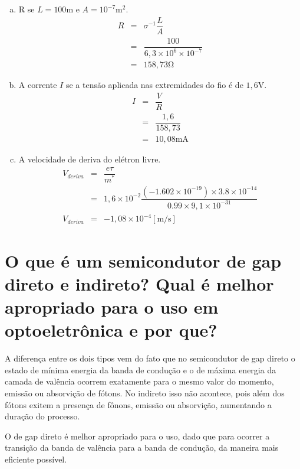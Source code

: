 \begin{enumerate}[a)]
  \item R se $L = 100 \si{\meter}$ e $A = 10^{-7} \si{\meter^{2}}$.
    \begin{eqnarray*}
      R & = & \sigma^{-1} \dfrac{L}{A} \\ \nonumber
        & = & \dfrac{100}{6,3 \times 10^{6} \times 10^{-7}} \\ \nonumber
        & = & 158,73 \si{\ohm}\nonumber
    \end{eqnarray*}
  \item A corrente $I$ se a tensão aplicada nas extremidades do fio é
    de $1,6 \si{\volt}$.
    \begin{eqnarray*}
      I & = & \dfrac{V}{R} \\ \nonumber
        & = & \dfrac{1,6}{158,73} \\ \nonumber
        & = & 10,08 \si{\milli\ampere}\nonumber
    \end{eqnarray*}
  \item A velocidade de deriva do elétron livre.
    \begin{eqnarray*}
      V_{deriva} & = &  \dfrac{e \tau}{m^{*}} \\ \nonumber
               & = & 1,6 \times 10^{-2} \dfrac
                       {(-1.602 \times 10^{-19}) \times 3.8 \times 10^{-14}}
                       {0.99 \times 9,1 \times 10^{-31}} \\ \nonumber
      V_{deriva} & = & - 1,08 \times 10^{-4} [\si{\meter/\second}] \nonumber
    \end{eqnarray*}
  \end{enumerate}

\section*{O que  é um semicondutor  de gap  direto e indireto?  Qual é
melhor apropriado para o uso em optoeletrônica e por que?}
\label{q13}

A diferença entre os dois tipos vem do fato que no semicondutor de gap
direto o estado de  mínima energia da banda de condução  e o de máxima
energia da camada de valência ocorrem exatamente para o mesmo valor do
momento,  emissão  ou absorvição  de  fótons.   No indireto  isso  não
acontece, pois além dos fótons exitem a presença de fônons, emissão ou
absorvição, aumentando a duração do processo.


\noindent O de gap direto é melhor apropriado para o uso, dado que para ocorrer
a transição da banda de valência  para a banda de condução, da maneira
mais eficiente  possível.

